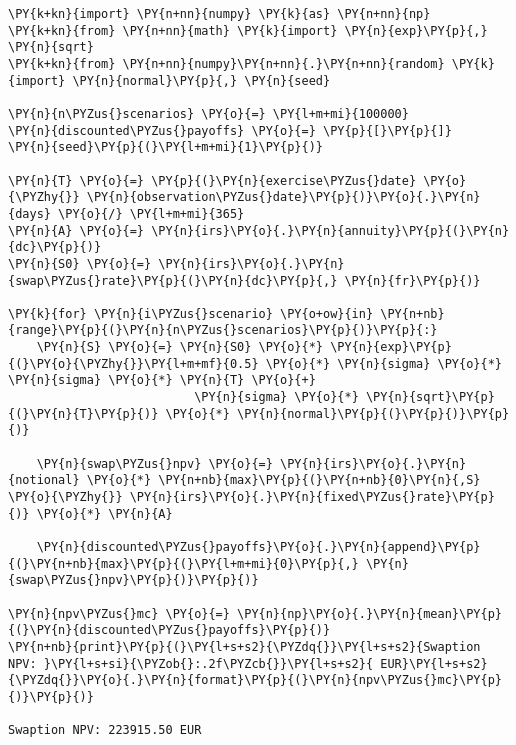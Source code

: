 \begin{codebox}[breakable, size=fbox, boxrule=1pt, pad at break*=1mm,colback=cellbackground, colframe=cellborder]
\begin{Verbatim}[commandchars=\\\{\}]
\PY{k+kn}{import} \PY{n+nn}{numpy} \PY{k}{as} \PY{n+nn}{np}
\PY{k+kn}{from} \PY{n+nn}{math} \PY{k}{import} \PY{n}{exp}\PY{p}{,} \PY{n}{sqrt}
\PY{k+kn}{from} \PY{n+nn}{numpy}\PY{n+nn}{.}\PY{n+nn}{random} \PY{k}{import} \PY{n}{normal}\PY{p}{,} \PY{n}{seed}

\PY{n}{n\PYZus{}scenarios} \PY{o}{=} \PY{l+m+mi}{100000}
\PY{n}{discounted\PYZus{}payoffs} \PY{o}{=} \PY{p}{[}\PY{p}{]}
\PY{n}{seed}\PY{p}{(}\PY{l+m+mi}{1}\PY{p}{)}

\PY{n}{T} \PY{o}{=} \PY{p}{(}\PY{n}{exercise\PYZus{}date} \PY{o}{\PYZhy{}} \PY{n}{observation\PYZus{}date}\PY{p}{)}\PY{o}{.}\PY{n}{days} \PY{o}{/} \PY{l+m+mi}{365}
\PY{n}{A} \PY{o}{=} \PY{n}{irs}\PY{o}{.}\PY{n}{annuity}\PY{p}{(}\PY{n}{dc}\PY{p}{)}
\PY{n}{S0} \PY{o}{=} \PY{n}{irs}\PY{o}{.}\PY{n}{swap\PYZus{}rate}\PY{p}{(}\PY{n}{dc}\PY{p}{,} \PY{n}{fr}\PY{p}{)}
    
\PY{k}{for} \PY{n}{i\PYZus{}scenario} \PY{o+ow}{in} \PY{n+nb}{range}\PY{p}{(}\PY{n}{n\PYZus{}scenarios}\PY{p}{)}\PY{p}{:}
    \PY{n}{S} \PY{o}{=} \PY{n}{S0} \PY{o}{*} \PY{n}{exp}\PY{p}{(}\PY{o}{\PYZhy{}}\PY{l+m+mf}{0.5} \PY{o}{*} \PY{n}{sigma} \PY{o}{*} \PY{n}{sigma} \PY{o}{*} \PY{n}{T} \PY{o}{+}
                          \PY{n}{sigma} \PY{o}{*} \PY{n}{sqrt}\PY{p}{(}\PY{n}{T}\PY{p}{)} \PY{o}{*} \PY{n}{normal}\PY{p}{(}\PY{p}{)}\PY{p}{)}
    
    \PY{n}{swap\PYZus{}npv} \PY{o}{=} \PY{n}{irs}\PY{o}{.}\PY{n}{notional} \PY{o}{*} \PY{n+nb}{max}\PY{p}{(}\PY{n+nb}{0}\PY{n}{,S} \PY{o}{\PYZhy{}} \PY{n}{irs}\PY{o}{.}\PY{n}{fixed\PYZus{}rate}\PY{p}{)} \PY{o}{*} \PY{n}{A}
    
    \PY{n}{discounted\PYZus{}payoffs}\PY{o}{.}\PY{n}{append}\PY{p}{(}\PY{n+nb}{max}\PY{p}{(}\PY{l+m+mi}{0}\PY{p}{,} \PY{n}{swap\PYZus{}npv}\PY{p}{)}\PY{p}{)}
    
\PY{n}{npv\PYZus{}mc} \PY{o}{=} \PY{n}{np}\PY{o}{.}\PY{n}{mean}\PY{p}{(}\PY{n}{discounted\PYZus{}payoffs}\PY{p}{)}
\PY{n+nb}{print}\PY{p}{(}\PY{l+s+s2}{\PYZdq{}}\PY{l+s+s2}{Swaption NPV: }\PY{l+s+si}{\PYZob{}:.2f\PYZcb{}}\PY{l+s+s2}{ EUR}\PY{l+s+s2}{\PYZdq{}}\PY{o}{.}\PY{n}{format}\PY{p}{(}\PY{n}{npv\PYZus{}mc}\PY{p}{)}\PY{p}{)}

Swaption NPV: 223915.50 EUR
\end{Verbatim}
\end{codebox}


